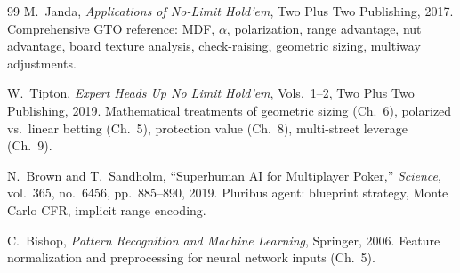 \documentclass[11pt, a4paper]{article}
\theoremstyle{definition}
\begin{document}
\begin{thebibliography}{99}
M.~Janda,
\textit{Applications of No-Limit Hold'em},
Two Plus Two Publishing, 2017.
\newblock Comprehensive GTO reference: MDF, $\alpha$, polarization, range advantage, nut advantage, board texture analysis, check-raising, geometric sizing, multiway adjustments.

W.~Tipton,
\textit{Expert Heads Up No Limit Hold'em},
Vols.~1--2, Two Plus Two Publishing, 2019.
\newblock Mathematical treatments of geometric sizing (Ch.~6), polarized vs.\ linear betting (Ch.~5), protection value (Ch.~8), multi-street leverage (Ch.~9).

N.~Brown and T.~Sandholm,
``Superhuman AI for Multiplayer Poker,''
\textit{Science}, vol.~365, no.~6456, pp.~885--890, 2019.
\newblock Pluribus agent: blueprint strategy, Monte Carlo CFR, implicit range encoding.

C.~Bishop,
\textit{Pattern Recognition and Machine Learning},
Springer, 2006.
\newblock Feature normalization and preprocessing for neural network inputs (Ch.~5).

\end{thebibliography}
\end{document}
